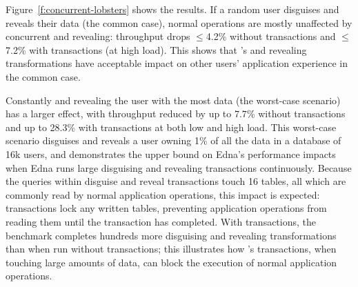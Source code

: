 %

%
Figure~\ref{f:concurrent-lobsters} shows the results.
%
If a random user disguises and reveals their data (the common case), normal
operations are mostly unaffected by concurrent \xxing and revealing: throughput
drops $\le$4.2\% without transactions and $\le$7.2\% with transactions (at high
load).
%
This shows that \sys's \xxing and revealing transformations have acceptable
impact on other users' application experience in the common case.

%
Constantly \xxing and revealing the user with the most data (the worst-case
scenario) has a larger effect, with throughput reduced by up to $7.7$\% without
transactions and up to 28.3\% with transactions at both low and high load.
%
%
%
This worst-case scenario disguises and reveals a user owning 1\% of all the data
in a database of 16k users, and demonstrates the upper bound on Edna’s
performance impacts when Edna runs large disguising and revealing transactions
continuously.  Because the queries within disguise and reveal transactions touch
16 tables, all which are commonly read by normal application operations, this
impact is expected: transactions lock any written tables, preventing
application operations from reading them until the transaction has completed.
%
With transactions, the benchmark completes hundreds more disguising and
revealing transformations than when run without transactions; this illustrates
how \sys's transactions, when touching large amounts of data, can block the
execution of normal application operations.


